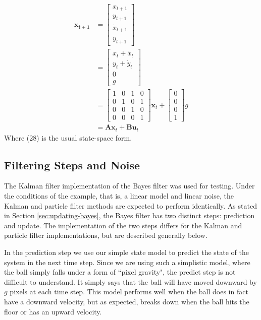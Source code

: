 \begin{align}
\mathbf{x_{t+1}} &=
\begin{bmatrix}
x_{t+1} \\ y_{t+1} \\ \dot{x}_{t+1} \\ \dot{y}_{t+1}
\end{bmatrix}
\\
&=
\begin{bmatrix}
x_{t} + \dot{x}_{t} \\ y_{t} + \dot{y}_{t} \\ 0 \\ g
\end{bmatrix}
\\
&=
\begin{bmatrix}
1 & 0 & 1 & 0 \\ 0 & 1 & 0 & 1 \\ 0 & 0 & 1 & 0 \\ 0 & 0 & 0 & 1
\end{bmatrix}
\mathbf{x}_{t} + 
\begin{bmatrix}
0 \\ 0 \\ 0 \\ 1
\end{bmatrix}
g
\\
&=
\mathbf{Ax}_{t} + \mathbf{Bu}_{t}
\end{align}
Where (28) is the usual state-space form.

\subsection{Filtering Steps and Noise}
The Kalman filter implementation of the Bayes filter was used for testing. Under
the conditions of the example, that is, a linear model and linear noise,
the Kalman and particle filter methods are expected to perform identically. As
stated in Section \ref{sec:updating-bayes}, the Bayes filter has two distinct steps:
prediction and update. The implementation of the two steps differs
for the Kalman and particle filter implementations, but are described generally
below.

In the prediction step we use our simple state
model to predict the state of the system in the next time step. Since we are using
such a simplistic model, where the ball simply falls under a form of
``pixel gravity", the predict
step is not difficult to understand. It simply says that the ball will have moved downward by
$g$ pixels at each time step. This model performs well when the ball does in fact
have a downward velocity, but as expected, breaks down when the ball hits the floor
or has an upward velocity.

